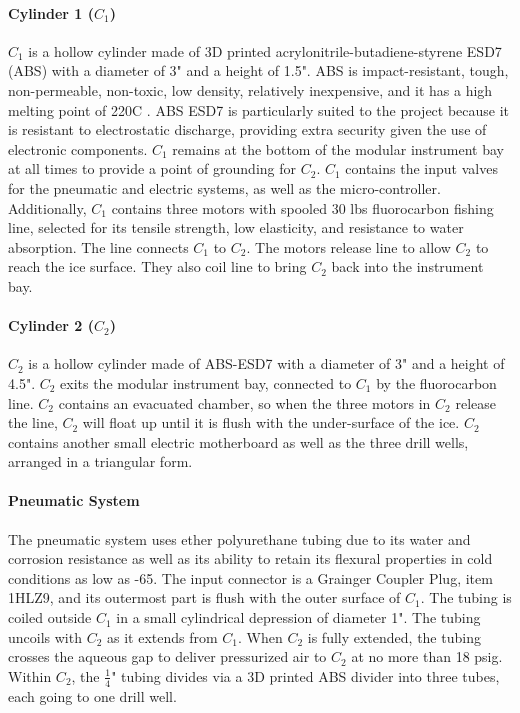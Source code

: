 \documentclass{article}
\begin{document}
\paragraph{Cylinder 1 ($C_1$)}

$C_1$ is a hollow cylinder made of 3D printed acrylonitrile-butadiene-styrene ESD7 (ABS) with a diameter of 3" and a height of 1.5". ABS is impact-resistant, tough, non-permeable, non-toxic, low density, relatively inexpensive, and it has a high melting point of 220C \cite{Hamod}. ABS ESD7 is particularly suited to the project because it is resistant to electrostatic discharge, providing extra security given the use of electronic components\cite{Stratasys}. $C_1$ remains at the bottom of the modular instrument bay at all times to provide a point of grounding for $C_2$. $C_1$ contains the input valves for the pneumatic and electric systems, as well as the micro-controller. Additionally, $C_1$ contains three motors with spooled 30 lbs fluorocarbon fishing line, selected for its tensile strength, low elasticity, and resistance to water absorption. The line connects $C_1$ to $C_2$. The motors release line to allow $C_2$ to reach the ice surface. They also coil line to bring $C_2$ back into the instrument bay.

\paragraph{Cylinder 2 ($C_2$)}
$C_2$ is a hollow cylinder made of ABS-ESD7 with a diameter of 3" and a height of 4.5". $C_2$ exits the modular instrument bay, connected to $C_1$ by the fluorocarbon line. $C_2$ contains an evacuated chamber, so when the three motors in $C_2$ release the line, $C_2$ will float up until it is flush with the under-surface of the ice. $C_2$ contains another small electric motherboard as well as the three drill wells, arranged in a triangular form.

\paragraph{Pneumatic System}
The pneumatic system uses ether polyurethane tubing due to its water and corrosion resistance as well as its ability to retain its flexural properties in cold conditions as low as -65\cite{Ann}. The input connector is a Grainger Coupler Plug, item 1HLZ9, and its outermost part is flush with the outer surface of $C_1$. The tubing is coiled outside $C_1$ in a small cylindrical depression of diameter 1". The tubing uncoils with $C_2$ as it extends from $C_1$. When $C_2$ is fully extended, the tubing crosses the aqueous gap to deliver pressurized air to $C_2$ at no more than 18 psig. Within $C_2$, the $\frac{1}{4}$" tubing divides via a 3D printed ABS divider into three tubes, each going to one drill well.
\end{document}
